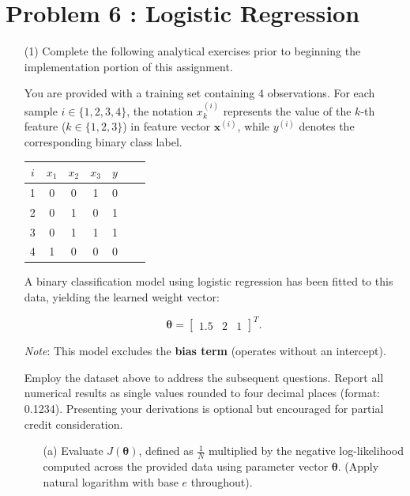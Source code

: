 \documentclass[11pt,addpoints,answers]{exam}
\newcommand{\xv}{\mathbf{x}}
\newcommand{\thetav}{\boldsymbol{\theta}}
\begin{document}
	
	
	\section*{Problem 6 : Logistic Regression}
	\label{sec:warm-up}
	
	\begin{enumerate}
		\item[(1)] Complete the following analytical exercises prior to beginning the implementation portion of this assignment.
		
		You are provided with a training set containing 4 observations. For each sample $i \in \{1, 2, 3, 4\}$, the notation $x_k^{(i)}$ represents the value of the $k$-th feature ($k \in \{1, 2, 3\}$) in feature vector $\xv^{(i)}$, while $y^{(i)}$ denotes the corresponding binary class label.
		
		\begin{center}
			\begin{tabular}{|c|c|c|c|c|c|c|}
				\hline
				$i$ & $x_{1}$ & $x_{2}$ & $x_{3}$ & $y$ \\ \hline
				1   & 0       &       0 &       1 & 0   \\ \hline
				2   & 0       &       1 &       0 & 1   \\ \hline
				3   & 0       &       1 &       1 & 1   \\ \hline
				4   & 1       &       0 &       0 & 0   \\ \hline
				
			\end{tabular}
		\end{center}
		
		A binary classification model using logistic regression has been fitted to this data, yielding the learned weight vector:
		
		\[\thetav = \begin{bmatrix}1.5 & 2 & 1\end{bmatrix}^T.\]
		
		\textit{Note}: This model excludes the \textbf{bias term} (operates without an intercept).
		
		Employ the dataset above to address the subsequent questions. Report all numerical results as single values rounded to four decimal places (format: 0.1234). Presenting your derivations is optional but encouraged for partial credit consideration.
		
		\begin{enumerate}[label=\alph*), itemsep=10pt]
			\item[(a)] Evaluate $J(\thetav)$, defined as $\frac{1}{N}$ multiplied by the negative log-likelihood computed across the provided data using parameter vector $\thetav$. (Apply natural logarithm with base $e$ throughout).
			

\end{enumerate}
\end{enumerate}
\end{document}
